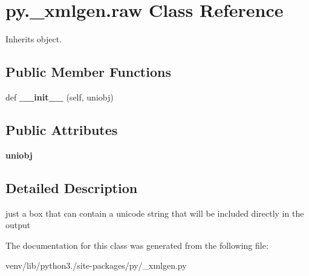 \hypertarget{classpy_1_1__xmlgen_1_1raw}{}\section{py.\+\_\+xmlgen.\+raw Class Reference}
\label{classpy_1_1__xmlgen_1_1raw}


Inherits object.

\subsection*{Public Member Functions}
\begin{DoxyCompactItemize}
\item 
\mbox{\label{classpy_1_1__xmlgen_1_1raw_a6173f5b6a0cca8cd0d8f2c2bbb1a33b6}} 
def {\bfseries \+\_\+\+\_\+init\+\_\+\+\_\+} (self, uniobj)
\end{DoxyCompactItemize}
\subsection*{Public Attributes}
\begin{DoxyCompactItemize}
\item 
\mbox{\label{classpy_1_1__xmlgen_1_1raw_acb31626b627277c32e6f8a28ba270430}} 
{\bfseries uniobj}
\end{DoxyCompactItemize}


\subsection{Detailed Description}
\begin{DoxyVerb}just a box that can contain a unicode string that will be
included directly in the output\end{DoxyVerb}
 

The documentation for this class was generated from the following file\+:\begin{DoxyCompactItemize}
\item 
venv/lib/python3./site-\/packages/py/\+\_\+xmlgen.\+py\end{DoxyCompactItemize}
